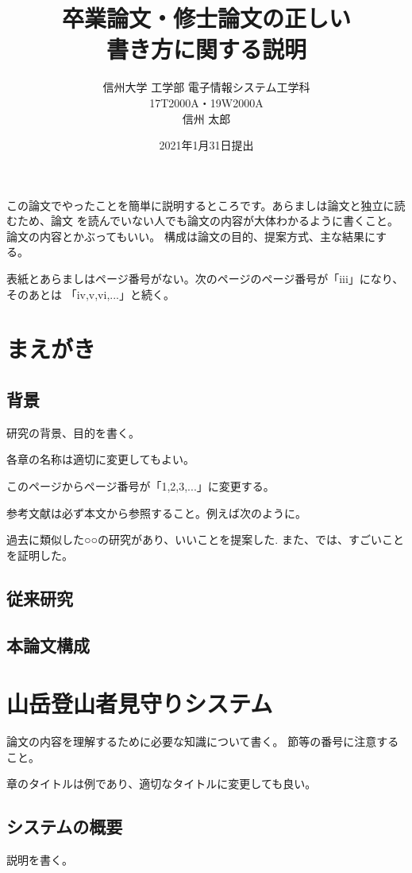 \documentclass[12pt]{jreport}
\title{
\bf 卒業論文・修士論文の正しい\\
書き方に関する説明
}
\date{
2021年1月31日提出
}
\author{
信州大学 工学部 電子情報システム工学科 \\     
17T2000A・19W2000A \\
信州 太郎 \\
}
\begin{document}
\maketitle
\maegaki

\begin{jabstract}
    この論文でやったことを簡単に説明するところです。あらましは論文と独立に読むため、論文
    を読んでいない人でも論文の内容が大体わかるように書くこと。論文の内容とかぶってもいい。
    構成は論文の目的、提案方式、主な結果にする。

    表紙とあらましはページ番号がない。次のページのページ番号が「iii」になり、そのあとは
    「iv,v,vi,...」と続く。
\end{jabstract}

\maetsuke
\tableofcontents
\listoffigures
\listoftables

\hombun

\chapter{まえがき}
\section{背景}
研究の背景、目的を書く。

各章の名称は適切に変更してもよい。

このページからページ番号が「1,2,3,...」に変更する。

参考文献は必ず本文から参照すること。例えば次のように。

過去に類似した○○の研究があり、いいことを提案した\cite{ref1}\cite{ref2}.
また、\cite{ref3}では、すごいことを証明した。

\section{従来研究}
\section{本論文構成}

\chapter{山岳登山者見守りシステム}
論文の内容を理解するために必要な知識について書く。
節等の番号に注意すること。

章のタイトルは例であり、適切なタイトルに変更しても良い。

\section{システムの概要}
説明を書く。
\end{document}
